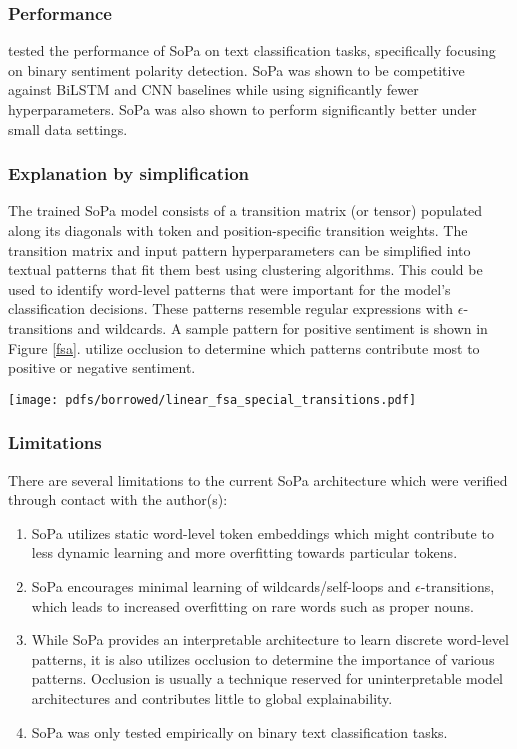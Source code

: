 \subsubsection{Performance}

\citet{schwartz2018sopa} tested the performance of SoPa on text classification tasks, specifically focusing on binary sentiment polarity detection. SoPa was shown to be competitive against BiLSTM and CNN baselines while using significantly fewer hyperparameters. SoPa was also shown to perform significantly better under small data settings. 

\subsubsection{Explanation by simplification}

The trained SoPa model consists of a transition matrix (or tensor) populated along its diagonals with token and position-specific transition weights. The transition matrix and input pattern hyperparameters can be simplified into textual patterns that fit them best using clustering algorithms. This could be used to identify word-level patterns that were important for the model's classification decisions. These patterns resemble regular expressions with $\epsilon$-transitions and wildcards. A sample pattern for positive sentiment is shown in Figure \ref{fsa}. \citet{schwartz2018sopa} utilize occlusion to determine which patterns contribute most to positive or negative sentiment.

\begin{figure*}
  \centering 
  \texttt{[image: pdfs/borrowed/linear\_fsa\_special\_transitions.pdf]} 
  \caption{Example mimic FSA simplified from SoPa and its corresponding WFSAs \citep{schwartz2018sopa}}
  \label{fsa}
\end{figure*}

\subsubsection{Limitations}
\label{sopa-limitations}

There are several limitations to the current SoPa architecture which were verified through contact with the author(s):

\begin{enumerate}
  \item SoPa utilizes static word-level token embeddings which might contribute to less dynamic learning and more overfitting towards particular tokens.
  \item SoPa encourages minimal learning of wildcards/self-loops and $\epsilon$-transitions, which leads to increased overfitting on rare words such as proper nouns.
  \item While SoPa provides an interpretable architecture to learn discrete word-level patterns, it is also utilizes occlusion to determine the importance of various patterns. Occlusion is usually a technique reserved for uninterpretable model architectures and contributes little to global explainability.
  \item SoPa was only tested empirically on binary text classification tasks.  
\end{enumerate}

